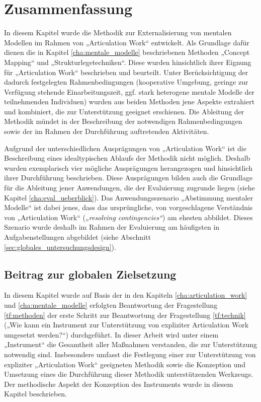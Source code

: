 
\section{Zusammenfassung} %
\label{sec:methodik_zusammenfassung}

In diesem Kapitel wurde die Methodik zur Externalisierung von mentalen Modellen im Rahmen von „Articulation Work“ entwickelt. Als Grundlage dafür dienen die in Kapitel \ref{cha:mentale_modelle} beschriebenen Methoden „Concept Mapping“ und „Strukturlegetechniken“. Diese wurden hinsichtlich ihrer Eignung für „Articulation Work“ beschrieben und beurteilt. Unter Berücksichtigung der dadurch festgelegten Rahmenbedingungen (kooperative Umgebung, geringe zur Verfügung stehende Einarbeitungszeit, ggf. stark heterogene mentale Modelle der teilnehmenden Individuen) wurden aus beiden Methoden jene Aspekte extrahiert und kombiniert, die zur Unterstützung geeignet erschienen. Die Ableitung der Methodik mündet in der Beschreibung der notwendigen Rahmenbedingungen sowie der im Rahmen der Durchführung auftretenden Aktivitäten. 

Aufgrund der unterschiedlichen Ausprägungen von „Articulation Work“ ist die Beschreibung eines idealtypischen Ablaufs der Methodik nicht möglich. Deshalb wurden exemplarisch vier mögliche Ausprägungen herangezogen und hinsichtlich ihrer Durchführung beschrieben. Diese Ausprägungen bilden auch die Grundlage für die Ableitung jener Anwendungen, die der Evaluierung zugrunde liegen (siehe Kapitel \ref{cha:eval_ueberblick}). Das Anwendungsszenario „Abstimmung mentaler Modelle“ ist dabei jenes, dass das ursprüngliche, von \citep{Strauss85} vorgeschlagene Verständnis von „Articulation Work“ (\emph{„resolving contingencies“}) am ehesten abbildet. Dieses Szenario wurde deshalb im Rahmen der Evaluierung am häufigsten in Aufgabenstellungen abgebildet (siehe Abschnitt \ref{sec:globales_untersuchungsdesign}).

\subsection{Beitrag zur globalen Zielsetzung}

In diesem Kapitel wurde auf Basis der in den Kapiteln \ref{cha:articulation_work} und \ref{cha:mentale_modelle} erfolgten Beantwortung der Fragestellung \ref{tf:methoden} der erste Schritt zur Beantwortung der Fragestellung \ref{tf:technik} („Wie kann ein Instrument zur Unterstützung von expliziter Articulation Work umgesetzt werden?“) durchgeführt. In dieser Arbeit wird unter einem „Instrument“ die Gesamtheit aller Maßnahmen verstanden, die zur Unterstützung notwendig sind. Insbesondere umfasst die Festlegung einer zur Unterstützung von expliziter „Articulation Work“ geeigneten Methodik sowie die Konzeption und Umsetzung eines die Durchführung dieser Methodik unterstützenden Werkzeugs. Der methodische Aspekt der Konzeption des Instruments wurde in diesem Kapitel beschrieben.


